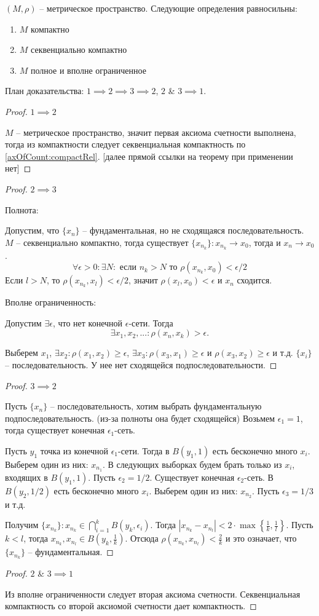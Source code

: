 \documentclass[main]{subfiles}
\begin{document}
\begin{theorem}
    $(M, \rho)$ -- метрическое пространство. Следующие определения равносильны:
    \begin{enumerate}
        \item $M$ компактно
        \item $M$ секвенциально компактно
        \item $M$ полное и вполне ограниченное
    \end{enumerate}
\end{theorem}
План доказательства: $1 \implies 2 \implies 3 \implies 2$, $2$ \& $3 \implies 1$.
\begin{proof}
    $1 \implies 2$

    $M$ -- метрическое пространство, значит первая аксиома счетности выполнена, тогда из компактности следует секвенциальная компактность по \ref{axOfCount:compactRel}.
    [далее прямой ссылки на теорему при применении нет]
\end{proof}
\begin{proof}
    $2 \implies 3$

    Полнота:

    Допустим, что $\{x_n\}$ -- фундаментальная, но не сходящаяся последовательность.
    $M$ -- секвенциально компактно, тогда существует $\{x_{n_k}\} : x_{n_k} \to x_0$,
    тогда и $x_n \to x_0$.
    \[\forall \epsilon >0: \exists N: \text{ если } n_k > N \text{ то } \rho(x_{n_k}, x_0) < \epsilon/2\]
    Если $l > N$, то $\rho(x_{n_k}, x_l) < \epsilon/2$, значит $\rho(x_l, x_0) < \epsilon$ и $x_n$ сходится.

    Вполне ограниченность:

    Допустим $\exists \epsilon$, что нет конечной $\epsilon$-сети.
    Тогда \[\exists x_1, x_2, ...:\rho(x_n, x_k) > \epsilon.\]

    Выберем $x_1$, $\exists x_2: \rho(x_1, x_2) \ge \epsilon$,
    $\exists x_3: \rho(x_3, x_1) \ge \epsilon$ и $\rho(x_3, x_2) \ge \epsilon$ и т.д.
    $\{x_i\}$ -- последовательность. У нее нет сходящейся подпоследовательности.
\end{proof}
\begin{proof}
    $3 \implies 2$

    Пусть $\{x_n\}$ -- последовательность, хотим выбрать фундаментальную подпоследовательность.
    (из-за полноты она будет сходящейся)
    Возьмем $\epsilon_1 = 1$, тогда существует конечная $\epsilon_1$-сеть.

    Пусть $y_1$ точка из конечной $\epsilon_1$-сети.
    Тогда в $B(y_1, 1)$  есть бесконечно много $x_i$.
    Выберем один из них: $x_{n_1}$.
    В следующих выборках будем брать только из $x_i$, входящих в $B(y_1, 1)$.
    Пусть $\epsilon_2 = 1/2$. Существует конечная $\epsilon_2$-сеть.
    В $B(y_2, 1/2)$ есть бесконечно много $x_i$.
    Выберем один из них: $x_{n_2}$.
    Пусть $\epsilon_3 = 1/3$ и т.д.

    Получим $\{x_{n_k}\} : x_{n_k} \in \bigcap_{i=1}^k B(y_k, \epsilon_i)$.
    Тогда $|x_{n_k} - x_{n_l}| < 2 \cdot \max\left\{\frac{1}{k}, \frac{1}{l}\right\}$.
    Пусть $k < l$, тогда $x_{n_k}, x_{n_l} \in B\left(y_k, \frac{1}{k}\right)$.
    Отсюда $\rho (x_{n_k}, x_{n_l}) < \frac{2}{k}$ и это означает, что $\{x_{n_k}\}$ -- фундаментальная.
\end{proof}
\begin{proof}
    $2$ \& $3 \implies 1$

    Из вполне ограниченности следует вторая аксиома счетности.
    Секвенциальная компактность со второй аксиомой счетности дает компактность.
\end{proof}
\end{document}
